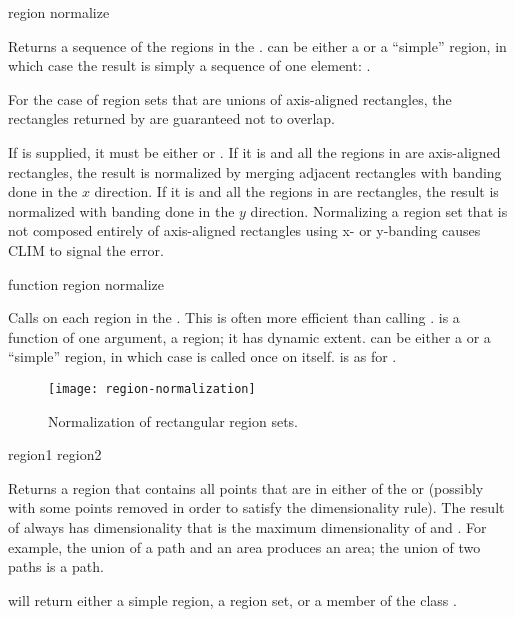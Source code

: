  {region \key normalize}

Returns a sequence of the regions in the  .
 can be either a  or a ``simple'' region, in which
case the result is simply a sequence of one element: .
\ReadOnly

For the case of region sets that are unions of axis-aligned rectangles, the
rectangles returned by  are guaranteed not to overlap.

If  is supplied, it must be either  or
.  If it is  and all the regions in 
are axis-aligned rectangles, the result is normalized by merging adjacent
rectangles with banding done in the $x$ direction.  If it is  and
all the regions in  are rectangles, the result is normalized with
banding done in the $y$ direction.  Normalizing a region set that is not
composed entirely of axis-aligned rectangles using x- or y-banding causes CLIM
to signal the  error.

 {function region \key normalize}

Calls  on each region in the  .  This
is often more efficient than calling .   is
a function of one argument, a region; it has dynamic extent.   can
be either a  or a ``simple'' region, in which case
 is called once on  itself.   is as for
.


\begin{figure}
\centerline{\texttt{[image: region-normalization]}}
\caption{Normalization of rectangular region sets.}
\end{figure}


 {region1 region2}

Returns a region that contains all points that are in either of the
  or  (possibly with some points removed
in order to satisfy the dimensionality rule).  The result of 
always has dimensionality that is the maximum dimensionality of 
and .  For example, the union of a path and an area produces an
area; the union of two paths is a path.

 will return either a simple region, a region set, or a member
of the class .

